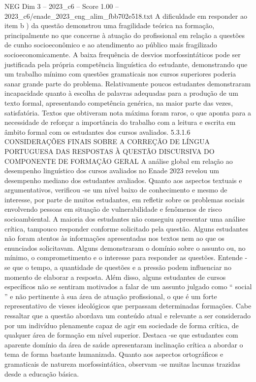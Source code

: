 \begin{textsample}{NEG Dim 3 – 2023\_c6 – Score 1.00 – 2023\_c6/enade\_2023\_eng\_alim\_fbb702e518.txt}
A dificuldade em responder ao item b ) da questão demonstrou uma fragilidade teórica na formação, principalmente no que concerne à atuação do profissional em relação a questões de cunho socioeconômico e ao atendimento ao público mais fragilizado socioeconomicamente.
A baixa frequência de desvios morfossintáticos pode ser justificada pela própria competência linguística do estudante, demonstrando que um trabalho mínimo com questões gramaticais nos cursos superiores poderia sanar grande parte do problema.
Relativamente poucos estudantes demonstraram incapacidade quanto à escolha de palavras adequadas para a produção de um texto formal, apresentando competência genérica, na maior parte das vezes, satisfatória.
Textos que obtiveram nota máxima foram raros, o que aponta para a necessidade de reforçar a importância do trabalho com a leitura e escrita em âmbito formal com os estudantes dos cursos avaliados. 5.3.1.6 CONSIDERAÇÕES FINAIS SOBRE A CORREÇÃO DE LÍNGUA PORTUGUESA DAS RESPOSTAS À QUESTÃO DISCURSIVA DO COMPONENTE DE FORMAÇÃO GERAL A análise global em relação ao desempenho linguístico dos cursos avaliados no Enade 2023 revelou um desempenho mediano dos estudantes avaliados.
Quanto aos aspectos textuais e argumentativos, verificou -se um nível baixo de conhecimento e mesmo de interesse, por parte de muitos estudantes, em refletir sobre os problemas sociais envolvendo pessoas em situação de vulnerabilidade e fenômenos de risco socioambiental.
A maioria dos estudantes não conseguiu apresentar uma análise crítica, tampouco responder conforme solicitado pela questão.
Alguns estudantes não foram atentos às informações apresentadas nos textos nem ao que os enunciados solicitavam.
Alguns demonstraram o domínio sobre o assunto ou, no mínimo, o comprometimento e o interesse para responder as questões.
Entende -se que o tempo, a quantidade de questões e a pressão podem influenciar no momento de elaborar a resposta.
Além disso, alguns estudantes de cursos específicos não se sentiram motivados a falar de um assunto julgado como “ social ” e não pertinente à sua área de atuação profissional, o que é um forte representativo de vieses ideológicos que perpassam determinadas formações.
Cabe ressaltar que a questão abordava um conteúdo atual e relevante a ser considerado por um indivíduo plenamente capaz de agir em sociedade de forma crítica, de qualquer área de formação em nível superior.
Destaca -se que estudantes com aparente domínio da área de saúde apresentaram inclinação crítica a abordar o tema de forma bastante humanizada.
Quanto aos aspectos ortográficos e gramaticais de natureza morfossintática, observam -se muitas lacunas trazidas desde a educação básica.

\end{textsample}
